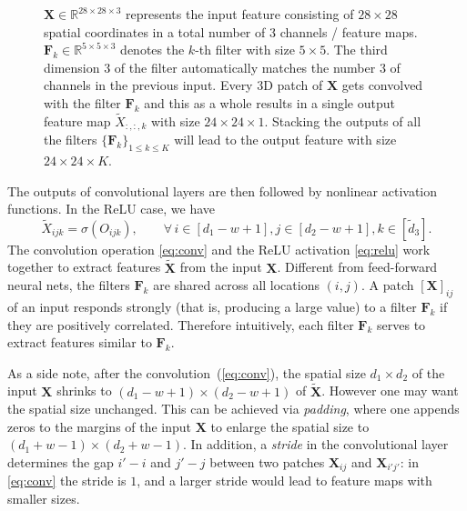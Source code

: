 \begin{enumerate}
\begin{figure}
\caption{$\bm{X}\in \mathbb{R}^{28\times 28 \times 3}$ represents the input feature consisting of $28 \times 28$ spatial coordinates in a total number of 3  channels / feature maps. $\bm{F}_{k}\in\mathbb{R}^{5\times 5 \times 3}$ denotes the $k$-th filter with size $5\times 5$. The third dimension $3$ of the filter automatically matches the number $3$  of channels in the previous input. Every 3D patch of $\bm{X}$ gets convolved with the filter $\bm{F}_{k}$ and this as a whole results in a single output feature map $\tilde{X}_{:,:,k}$ with size $24\times 24\times 1$. Stacking the outputs of all the filters $\{\bm{F}_{k}\}_{1\leq k\leq K}$ will lead to the output feature with size $24\times 24\times K$. \label{fig:Convolution-operation}}

\end{figure}
The outputs of convolutional layers are then followed by nonlinear activation functions. In the ReLU case, we have
\begin{equation}\label{eq:relu}
\tilde{X}_{ijk} = \sigma(O_{ijk}), \qquad \forall\, i \in [d_1-w+1], j \in [d_2-w+1], k \in [\tilde d_3].
\end{equation}
The convolution operation \eqref{eq:conv} and the ReLU activation \eqref{eq:relu} work together to extract features $\tilde{\bm{X}}$ from the input $\bm{X}$. %
Different from feed-forward neural nets, the filters $\bm{F}_k$ are shared across all locations $(i,j)$. A patch $[\bm{X}]_{ij}$ of an input responds strongly (that is, producing a large value) to a filter $\bm{F}_{k}$ if they are positively correlated. Therefore intuitively, each filter $\bm{F}_{k}$ serves to extract features similar to $\bm{F}_{k}$.

As a side note, after the convolution~(\ref{eq:conv}), the spatial size $d_1 \times d_2$ of the input $\bm{X}$ shrinks to ${(d_1-w+1)\times (d_2-w+1)}$ of $\tilde{\bm{X}}$. However one may want the spatial size unchanged. This can be achieved via \emph{padding}, where one appends zeros to the margins of the input $\bm{X}$ to enlarge the spatial size to $(d_1+w-1) \times (d_2+w-1)$. %
In addition, a \emph{stride} in the convolutional layer determines the gap $i' - i$ and $j'-j$ between two patches $\bm{X}_{ij}$ and $\bm{X}_{i'j'}$: in \eqref{eq:conv} the stride is $1$, and a larger stride would lead to feature maps with smaller sizes.


\end{enumerate}
